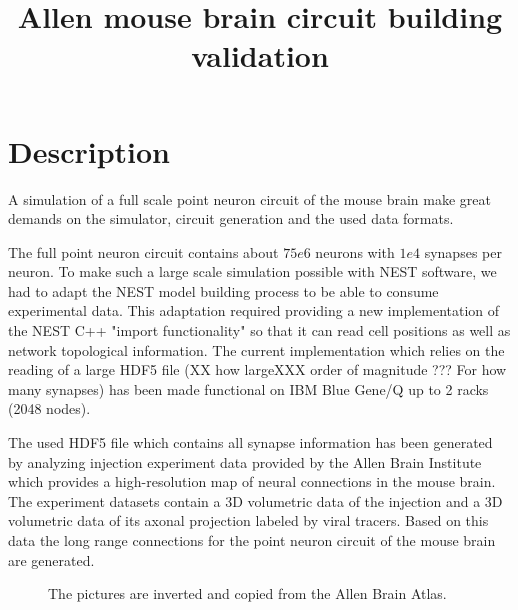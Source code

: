 \documentclass[a4paper]{IEEEtran}
\title{ Allen mouse brain circuit building validation}
\begin{document}
   \maketitle
   
   \section{Description}
   A simulation of a full scale point neuron circuit of the mouse brain make great demands on the simulator, circuit generation and the used data formats.   
   
   The full point neuron circuit contains about $75e6$ neurons with $1e4$ synapses per neuron.
   To make such a large scale simulation possible with NEST software, we had to adapt the NEST model building process to be able to consume
experimental data. This adaptation required providing a new implementation of the NEST C++ "import functionality" so that it can read cell positions as well as network topological information. The current implementation which relies on the reading of a large HDF5 file (XX how largeXXX order of magnitude ??? For how many synapses) has been made functional on IBM Blue Gene/Q up to 2 racks (2048 nodes).   

The used HDF5 file which contains all synapse information has been generated by analyzing injection experiment data provided by the 
Allen Brain Institute which provides a high-resolution map of neural connections in the mouse brain.
The experiment datasets contain a 3D volumetric data of the injection and a 3D volumetric data of its axonal projection labeled by viral
   tracers. Based on this data the long range connections for the point neuron circuit of the mouse brain are generated.
  
	 \begin{figure}[ht!]
   	\begin{center}
        \hspace{0.1cm}
    	   \end{center}
    	\caption{%
        The pictures are inverted and copied from the Allen Brain Atlas.
     }%
   \label{fig:atlas}
   \end{figure}  
  
\end{document}
